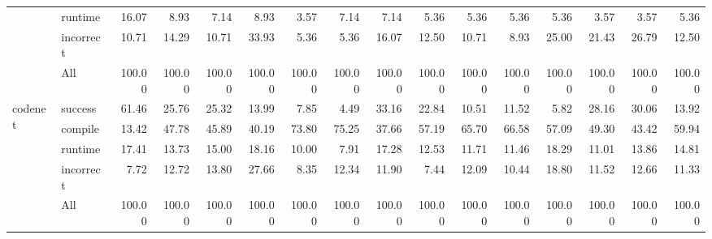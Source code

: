 \begin{tabular}{llrrrrrrrrrrrrrr}
 & runtime & 16.07 & 8.93 & 7.14 & 8.93 & 3.57 & 7.14 & 7.14 & 5.36 & 5.36 & 5.36 & 5.36 & 3.57 & 3.57 & 5.36 \\
 & incorrect & 10.71 & 14.29 & 10.71 & 33.93 & 5.36 & 5.36 & 16.07 & 12.50 & 10.71 & 8.93 & 25.00 & 21.43 & 26.79 & 12.50 \\
 & All & 100.00 & 100.00 & 100.00 & 100.00 & 100.00 & 100.00 & 100.00 & 100.00 & 100.00 & 100.00 & 100.00 & 100.00 & 100.00 & 100.00 \\
\cline{1-16}
\multirow[t]{5}{*}{codenet} & success & 61.46 & 25.76 & 25.32 & 13.99 & 7.85 & 4.49 & 33.16 & 22.84 & 10.51 & 11.52 & 5.82 & 28.16 & 30.06 & 13.92 \\
 & compile & 13.42 & 47.78 & 45.89 & 40.19 & 73.80 & 75.25 & 37.66 & 57.19 & 65.70 & 66.58 & 57.09 & 49.30 & 43.42 & 59.94 \\
 & runtime & 17.41 & 13.73 & 15.00 & 18.16 & 10.00 & 7.91 & 17.28 & 12.53 & 11.71 & 11.46 & 18.29 & 11.01 & 13.86 & 14.81 \\
 & incorrect & 7.72 & 12.72 & 13.80 & 27.66 & 8.35 & 12.34 & 11.90 & 7.44 & 12.09 & 10.44 & 18.80 & 11.52 & 12.66 & 11.33 \\
 & All & 100.00 & 100.00 & 100.00 & 100.00 & 100.00 & 100.00 & 100.00 & 100.00 & 100.00 & 100.00 & 100.00 & 100.00 & 100.00 & 100.00 \\
\cline{1-16}
\bottomrule
\end{tabular}
